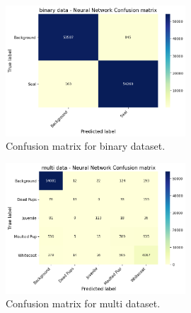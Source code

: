 \documentclass[letterpaper,12pt]{article}
\begin{document}
\begin{appendices}
\begin{figure}[h]
\centerline{\includegraphics[width=0.6\textwidth]{report/figures/binary_mlp_class_distribution.png}}
\caption{\label{fig:binary_mlp_class_distribution}Confusion matrix for binary dataset.}
\end{figure}

\begin{figure}[h]
\centerline{\includegraphics[width=0.6\textwidth]{report/figures/multi_mlp_class_distribution.png}}
\caption{\label{fig:multi_mlp_class_distribution}Confusion matrix for multi dataset.}
\end{figure}

\end{appendices}
\end{document}
